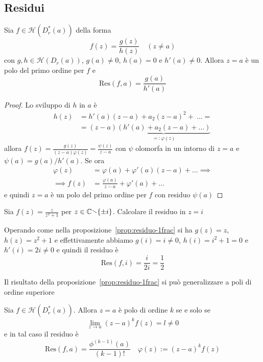 \subsection{Residui}
\begin{proposition}\label{prop:residuo-1frac}
    Sia \(f \in \mathcal{H}{(D^{*}_r{(a)})}\) della forma
    \[
      f{(z)} = \frac{g{(z)}}{h{(z)}} \quad {(z \neq a)}
    \]
    con \(g, h \in \mathcal{H}{(D_r{(a)})}\), \(g{(a)} \neq 0\), \(h{(a)} =
    0\) e \(h'{(a)} \neq 0\).
    Allora \(z = a\) è un polo del primo ordine per \(f\) e 
    \[
        \mathrm{Res} (f, a) = \frac{g{(a)}}{h'{(a)}}
    \]
\end{proposition}
\begin{proof}
    Lo sviluppo di \(h\) in \(a\) è 
    \begin{align*}
        h{(z)} &= h'{(a)}{(z-a)} + a_{2}{(z-a)}^2+~\dots = \\
               &= {(z-a)}\underbrace{(h'{(a)} + a_{2}{(z-a)} + \dots)}_{=: \varphi {(z)}} 
    \end{align*}
    allora \(\displaystyle f{(z)} = \frac{g{(z)}}{{(z-a)}\varphi {(z)}} =
    \frac{\psi{(z)}}{z-a}\) con \(\psi\) olomorfa in un intorno di \(z=a\) e
    \(\psi{(a)} = g{(a)} / h'{(a)}\). Se ora
    \begin{align*}
        \varphi {(z)} &= \varphi {(a)} + \varphi '{(a)}{(z-a)} + \dots \implies
        \\
        \implies f{(z)} &= \frac{\varphi {(a)}}{z-a} + \varphi '{(a)} + \dots
    \end{align*}
    e quindi \(z=a\) è un polo del primo ordine per \(f\) con residuo \(\psi{(a)}\) 
\end{proof}
\begin{eser}
    Sia \(\displaystyle f{(z)} = \frac{z}{z^2 + 1}\) per \(z \in \mathbb{C}
    \sminus \{\pm i\}\). Calcolare il residuo in \(z=i\)

    Operando come nella proposizione~\ref{prop:residuo-1frac} si ha \(g{(z)} =
    z\), \(h{(z)} = z^2 + 1\) e effettivamente abbiamo \(g{(i)} = i \neq 0\),
    \(h{(i)} = i^2 + 1 = 0\) e \(h'{(i)} = 2i \neq 0\) e quindi il residuo è 
    \[
        \mathrm{Res} (f, i) = \frac{i}{2i} = \frac{1}{2}
    \]
\end{eser}
Il risultato della proposizione~\ref{prop:residuo-1frac} si può generalizzare a
poli di ordine superiore
\begin{proposition}\label{prop:residuo-kfrac}
    Sia \(f \in \mathcal{H}{(D^{*}_r{(a)})}\). Allora \(z = a\) è polo di ordine
    \(k\) se e solo se
    \[
      \lim_{z \to a} {(z-a)}^{k}f{(z)} = l \neq 0
    \] e in tal caso il residuo è
    \[
        \mathrm{Res} (f, a) = \frac{\phi^{{(k-1)}}{(a)}}{(k-1)!} \quad \varphi
        {(z)} := {(z-a)}^{k}f{(z)}
    \]
\end{proposition}
